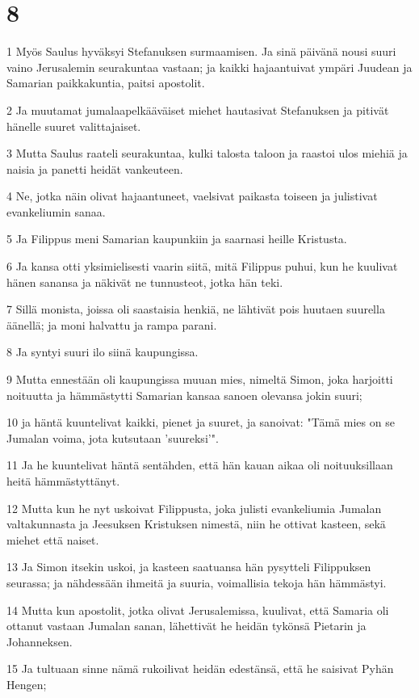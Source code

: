 \chapter{8}

\par 1 Myös Saulus hyväksyi Stefanuksen surmaamisen. Ja sinä päivänä nousi suuri vaino Jerusalemin seurakuntaa vastaan; ja kaikki hajaantuivat ympäri Juudean ja Samarian paikkakuntia, paitsi apostolit.
\par 2 Ja muutamat jumalaapelkääväiset miehet hautasivat Stefanuksen ja pitivät hänelle suuret valittajaiset.
\par 3 Mutta Saulus raateli seurakuntaa, kulki talosta taloon ja raastoi ulos miehiä ja naisia ja panetti heidät vankeuteen.
\par 4 Ne, jotka näin olivat hajaantuneet, vaelsivat paikasta toiseen ja julistivat evankeliumin sanaa.
\par 5 Ja Filippus meni Samarian kaupunkiin ja saarnasi heille Kristusta.
\par 6 Ja kansa otti yksimielisesti vaarin siitä, mitä Filippus puhui, kun he kuulivat hänen sanansa ja näkivät ne tunnusteot, jotka hän teki.
\par 7 Sillä monista, joissa oli saastaisia henkiä, ne lähtivät pois huutaen suurella äänellä; ja moni halvattu ja rampa parani.
\par 8 Ja syntyi suuri ilo siinä kaupungissa.
\par 9 Mutta ennestään oli kaupungissa muuan mies, nimeltä Simon, joka harjoitti noituutta ja hämmästytti Samarian kansaa sanoen olevansa jokin suuri;
\par 10 ja häntä kuuntelivat kaikki, pienet ja suuret, ja sanoivat: "Tämä mies on se Jumalan voima, jota kutsutaan 'suureksi'".
\par 11 Ja he kuuntelivat häntä sentähden, että hän kauan aikaa oli noituuksillaan heitä hämmästyttänyt.
\par 12 Mutta kun he nyt uskoivat Filippusta, joka julisti evankeliumia Jumalan valtakunnasta ja Jeesuksen Kristuksen nimestä, niin he ottivat kasteen, sekä miehet että naiset.
\par 13 Ja Simon itsekin uskoi, ja kasteen saatuansa hän pysytteli Filippuksen seurassa; ja nähdessään ihmeitä ja suuria, voimallisia tekoja hän hämmästyi.
\par 14 Mutta kun apostolit, jotka olivat Jerusalemissa, kuulivat, että Samaria oli ottanut vastaan Jumalan sanan, lähettivät he heidän tykönsä Pietarin ja Johanneksen.
\par 15 Ja tultuaan sinne nämä rukoilivat heidän edestänsä, että he saisivat Pyhän Hengen;
